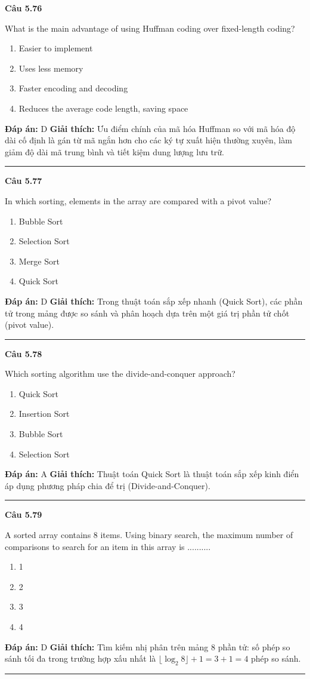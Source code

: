 \documentclass[11pt,a4paper]{article}
\newenvironment{question}[1]{%
  \par\vspace{1em}\noindent\textbf{\large Câu #1}\par\vspace{0.4em}
}{%
  \par\vspace{1em}\hrule\vspace{0.6em}
}
\newenvironment{choices}{%
  \begin{enumerate}[label=\textbf{\Alph*.},leftmargin=2.2em,itemsep=2pt,topsep=3pt]
}{%
  \end{enumerate}
}
\newcommand{\choice}{\item}
\begin{document}
\begin{question}{5.76}
What is the main advantage of using Huffman coding over fixed-length coding?
\begin{choices}
\choice Easier to implement
\choice Uses less memory
\choice Faster encoding and decoding
\choice Reduces the average code length, saving space
\end{choices}
\textbf{Đáp án:} D
\textbf{Giải thích:} Ưu điểm chính của mã hóa Huffman so với mã hóa độ dài cố định là gán từ mã ngắn hơn cho các ký tự xuất hiện thường xuyên, làm giảm độ dài mã trung bình và tiết kiệm dung lượng lưu trữ.
\end{question}

\begin{question}{5.77}
In which sorting, elements in the array are compared with a pivot value?
\begin{choices}
\choice Bubble Sort
\choice Selection Sort
\choice Merge Sort
\choice Quick Sort
\end{choices}
\textbf{Đáp án:} D
\textbf{Giải thích:} Trong thuật toán sắp xếp nhanh (Quick Sort), các phần tử trong mảng được so sánh và phân hoạch dựa trên một giá trị phần tử chốt (pivot value).
\end{question}

\begin{question}{5.78}
Which sorting algorithm use the divide-and-conquer approach?
\begin{choices}
\choice Quick Sort
\choice Insertion Sort
\choice Bubble Sort
\choice Selection Sort
\end{choices}
\textbf{Đáp án:} A
\textbf{Giải thích:} Thuật toán Quick Sort là thuật toán sắp xếp kinh điển áp dụng phương pháp chia để trị (Divide-and-Conquer).
\end{question}

\begin{question}{5.79}
A sorted array contains 8 items. Using binary search, the maximum number of comparisons to search for an item in this array is ..........
\begin{choices}
\choice 1
\choice 2
\choice 3
\choice 4
\end{choices}
\textbf{Đáp án:} D
\textbf{Giải thích:} Tìm kiếm nhị phân trên mảng 8 phần tử: số phép so sánh tối đa trong trường hợp xấu nhất là $\lfloor\log_2 8\rfloor + 1 = 3 + 1 = 4$ phép so sánh.
\end{question}
\end{document}
